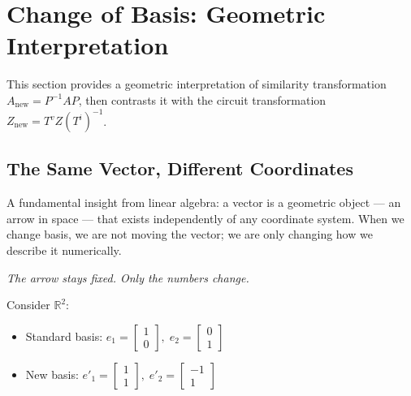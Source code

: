 \section{Change of Basis: Geometric Interpretation}

This section provides a geometric interpretation of similarity
transformation $A_{\text{new}} = P^{-1}AP$, then contrasts it with the
circuit transformation $Z_{\text{new}} = T^v Z (T^i)^{-1}$.

\subsection{The Same Vector, Different Coordinates}
\label{sec:same-vector}

A fundamental insight from linear algebra: a vector is a geometric
object — an arrow in space — that exists independently of any coordinate
system. When we change basis, we are not moving the vector; we are only
changing how we describe it numerically.

\begin{center}
\textit{The arrow stays fixed. Only the numbers change.}
\end{center}

Consider $\mathbb{R}^2$:

\begin{itemize}
    \item Standard basis:
    $
        e_1 =
        \begin{bmatrix}
        1\\0
        \end{bmatrix},
        \;
        e_2 =
        \begin{bmatrix}
        0\\1
        \end{bmatrix}
    $

    \item New basis:
    $
        e'_1 =
        \begin{bmatrix}
        1\\1
        \end{bmatrix},
        \;
        e'_2 =
        \begin{bmatrix}
        -1\\1
        \end{bmatrix}
    $
\end{itemize}

